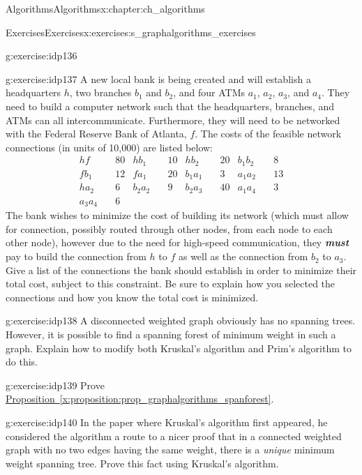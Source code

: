 \documentclass[oneside,10pt,]{book}
\newcommand{\xreffont}{\relax}
\newcommand{\alert}[1]{\textbf{\textit{#1}}}
\numberwithin{equation}{section}
\newcommand{\amp}{&}
\begin{document}
\begin{chapterptx}{Algorithms}{}{Algorithms}{}{}{x:chapter:ch_algorithms}
\begin{exercises-section}{Exercises}{}{Exercises}{}{}{x:exercises:s_graphalgorithms_exercises}
\begin{divisionexercise}{6}{}{}{g:exercise:idp136}
\end{divisionexercise}%
\begin{divisionexercise}{7}{}{}{g:exercise:idp137}%
A new local bank is being created and will establish a headquarters \(h\), two branches \(b_1\) and \(b_2\), and four ATMs \(a_1\), \(a_2\), \(a_3\), and \(a_4\). They need to build a computer network such that the headquarters, branches, and ATMs can all intercommunicate. Furthermore, they will need to be networked with the Federal Reserve Bank of Atlanta, \(f\). The costs of the feasible network connections (in units of \textdollar{}10,000) are listed below:%
\begin{align*}
h f \amp  \quad 80 \amp 
h b_1 \amp  \quad 10\amp  h b_2 \amp  \quad 20\amp 
b_1 b_2 \amp  \quad 8\\
f b_1 \amp  \quad 12\amp 
f a_1 \amp  \quad 20\amp  b_1 a_1 \amp  \quad 3\amp 
a_1 a_2 \amp  \quad 13\\
h a_2 \amp  \quad 6\amp 
b_2 a_2 \amp  \quad 9\amp  b_2 a_3 \amp  \quad 40\amp 
a_1 a_4 \amp  \quad 3\\
a_3 a_4 \amp \quad 6
\end{align*}
The bank wishes to minimize the cost of building its network (which must allow for connection, possibly routed through other nodes, from each node to each other node), however due to the need for high-speed communication, they \alert{must} pay to build the connection from \(h\) to \(f\) as well as the connection from \(b_2\) to \(a_3\). Give a list of the connections the bank should establish in order to minimize their total cost, subject to this constraint. Be sure to explain how you selected the connections and how you know the total cost is minimized.%
\end{divisionexercise}%
\begin{divisionexercise}{8}{}{}{g:exercise:idp138}%
A disconnected weighted graph obviously has no spanning trees. However, it is possible to find a spanning forest of minimum weight in such a graph. Explain how to modify both Kruskal's algorithm and Prim's algorithm to do this.%
\end{divisionexercise}%
\begin{divisionexercise}{9}{}{}{g:exercise:idp139}%
Prove \hyperref[x:proposition:prop_graphalgorithms_spanforest]{Proposition~{\xreffont\ref{x:proposition:prop_graphalgorithms_spanforest}}}.%
\end{divisionexercise}%
\begin{divisionexercise}{10}{}{}{g:exercise:idp140}%
In the paper where Kruskal's algorithm first appeared, he considered the algorithm a route to a nicer proof that in a connected weighted graph with no two edges having the same weight, there is a \emph{unique} minimum weight spanning tree. Prove this fact using Kruskal's algorithm.%

\end{divisionexercise}
\end{exercises-section}
\end{chapterptx}
\end{document}
